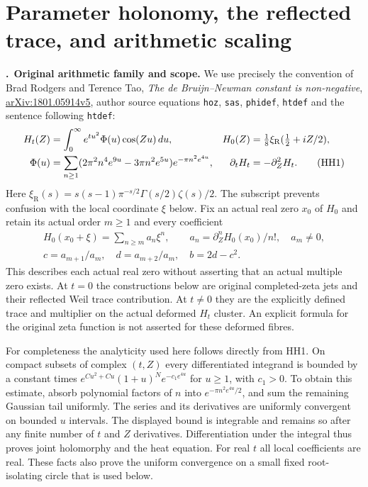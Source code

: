 \section{Parameter holonomy, the reflected trace, and arithmetic scaling}
\label{sec:hh}
\newcommand{\HH}{\par\medskip\noindent\textbf{\thehh.}\ }

\HH\textbf{Original arithmetic family and scope.}
We use precisely the convention of Brad Rodgers and Terence Tao,
\emph{The de Bruijn--Newman constant is non-negative},
\href{https://arxiv.org/abs/1801.05914v5}{arXiv:1801.05914v5},
author source equations \texttt{hoz}, \texttt{sas}, \texttt{phidef},
\texttt{htdef} and the sentence following \texttt{htdef}:
\begin{align}
 H_t(Z)&=\int_0^\infty e^{tu^2}\Phi(u)\cos(Zu)\,du,&
 H_0(Z)&=\tfrac18\xi_{\mathrm R}(\tfrac12+iZ/2),\notag\\
 \Phi(u)&=\sum_{n\ge1}
 (2\pi^2n^4e^{9u}-3\pi n^2e^{5u})e^{-\pi n^2e^{4u}},&
 \partial_tH_t&=-\partial_Z^2H_t .
 \tag{HH1}\label{hh:original}
\end{align}
Here $\xi_{\mathrm R}(s)=s(s-1)\pi^{-s/2}\Gamma(s/2)\zeta(s)/2$.
The subscript prevents confusion with the local coordinate $\xi$ below.
Fix an actual real zero $x_0$ of $H_0$ and retain its actual order
$m\ge1$ and every coefficient
\[
 \begin{gathered}
 H_0(x_0+\xi)=\sum_{n\ge m}a_n\xi^n,\qquad
 a_n=\partial_Z^nH_0(x_0)/n!,\quad a_m\ne0,\\
 c=a_{m+1}/a_m,\quad d=a_{m+2}/a_m,\quad b=2d-c^2 .
 \end{gathered}
 \tag{HH2}\label{hh:coeff}
\]
This describes each actual real zero without asserting that an actual
multiple zero exists. At $t=0$ the constructions below are original
completed-zeta jets and their reflected Weil trace contribution.
At $t\ne0$ they are the explicitly defined trace and multiplier on
the actual deformed $H_t$ cluster. An explicit formula for the original
zeta function is not asserted for these deformed fibres.

For completeness the analyticity used here follows directly from HH1.
On compact subsets of complex $(t,Z)$ every differentiated integrand
is bounded by a constant times
$e^{C u^2+Cu}(1+u)^N e^{-c_1e^{4u}}$ for $u\ge1$, with $c_1>0$.
To obtain this estimate, absorb polynomial factors of $n$ into
$e^{-\pi n^2e^{4u}/2}$, and sum the remaining Gaussian tail uniformly.
The series and its derivatives are uniformly convergent on bounded
$u$ intervals. The displayed bound is integrable and remains so
after any finite number of $t$ and $Z$ derivatives. Differentiation
under the integral thus proves joint holomorphy and the heat equation.
For real $t$ all local coefficients are real. These facts also prove
the uniform convergence on a small fixed root-isolating circle that
is used below.

